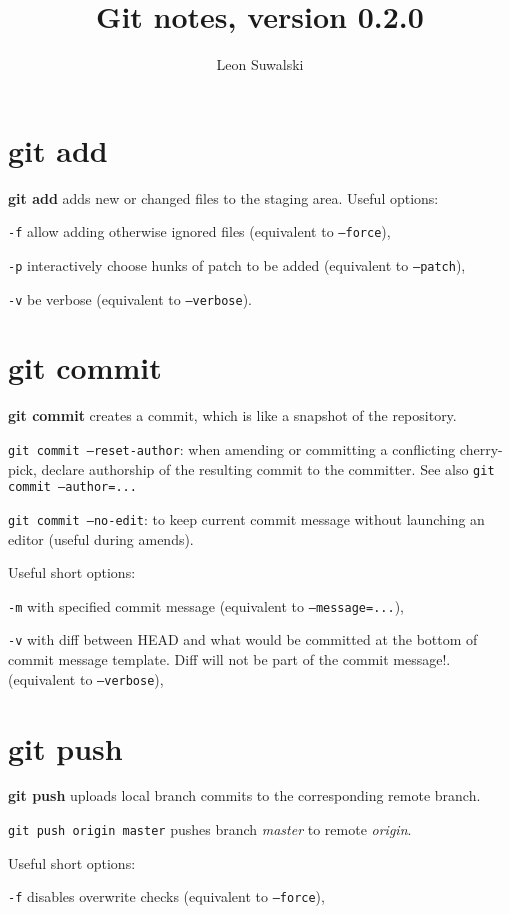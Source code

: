 \documentclass{charun}
\title{Git notes, version 0.2.0}
\author{Leon Suwalski}
\begin{document}
\begin{multicols*}{2}
\maketitle
\raggedright

\section{git add}
\textbf{git add} adds new or changed files to the staging area.
Useful options:
\begin{compactenum}
\item [\texttt{-f}] allow adding otherwise ignored files (equivalent to \texttt{--force}),
\item [\texttt{-p}] interactively choose hunks of patch to be added (equivalent to \texttt{--patch}),
\item [\texttt{-v}] be verbose (equivalent to \texttt{--verbose}).
\end{compactenum}

\section{git commit}
\textbf{git commit} creates a commit, which is like a snapshot of the repository.

\texttt{git commit --reset-author}: when amending or committing a conflicting cherry-pick, declare authorship of the resulting commit to the committer.
See also \texttt{git commit --author=...}

\texttt{git commit --no-edit}: to keep current commit message without launching an editor (useful during amends).

Useful short options:
\begin{compactenum}
\item [\texttt{-m}] with specified commit message (equivalent to \texttt{--message=...}),
\item [\texttt{-v}] with diff between HEAD and what would be committed at the bottom of commit message template.
Diff will not be part of the commit message!.
(equivalent to \texttt{--verbose}),
\end{compactenum}

\section{git push}
\textbf{git push} uploads local branch commits to the corresponding remote branch.

\texttt{git push origin master} pushes branch \emph{master} to remote \emph{origin}.

Useful short options:
\begin{compactenum}
\item [\texttt{-f}] disables overwrite checks (equivalent to \texttt{--force}),
\end{compactenum}

\end{multicols*}
\end{document}
